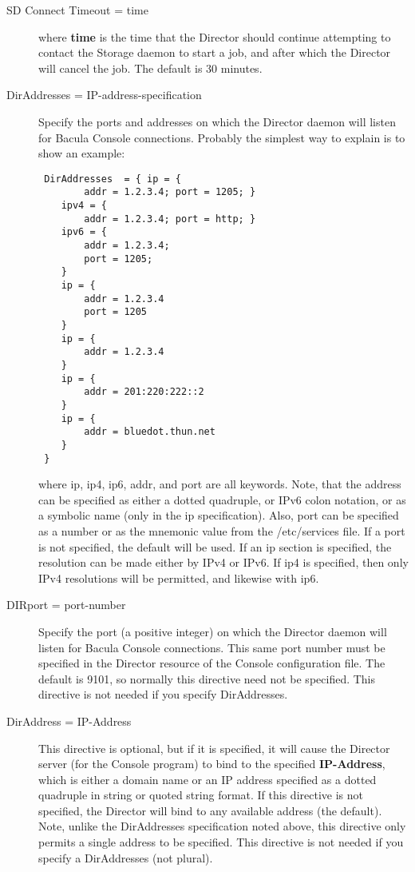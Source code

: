 \begin{description}
\item [SD Connect Timeout = \lt{}time\gt{}]
   where {\bf time}  is the time that the Director should continue attempting  to
contact the Storage daemon to start a job, and after which the  Director will
cancel the job. The default is 30 minutes. 

\item [DirAddresses = \lt{}IP-address-specification\gt{}]
   Specify the ports and addresses on which the Director daemon will  listen for
Bacula Console connections. Probably the simplest way  to explain is to show
an example: 

\footnotesize
\begin{verbatim}
 DirAddresses  = { ip = {
        addr = 1.2.3.4; port = 1205; }
    ipv4 = {
        addr = 1.2.3.4; port = http; }
    ipv6 = {
        addr = 1.2.3.4;
        port = 1205;
    }
    ip = {
        addr = 1.2.3.4
        port = 1205
    }
    ip = {
        addr = 1.2.3.4
    }
    ip = {
        addr = 201:220:222::2
    }
    ip = {
        addr = bluedot.thun.net
    }
 }
\end{verbatim}
\normalsize

where ip, ip4, ip6, addr, and port are all keywords. Note, that  the address
can be specified as either a dotted quadruple, or  IPv6 colon notation, or as
a symbolic name (only in the ip specification).  Also, port can be specified
as a number or as the mnemonic value from  the /etc/services file.  If a port
is not specified, the default will be used. If an ip  section is specified,
the resolution can be made either by IPv4 or  IPv6. If ip4 is specified, then
only IPv4 resolutions will be permitted,  and likewise with ip6. 

\item [DIRport = \lt{}port-number\gt{}]
   Specify the port (a positive  integer) on which the  Director daemon will
listen for Bacula Console connections.  This same port number must be
specified in the Director resource  of the Console configuration file. The
default is 9101, so  normally this directive need not be specified.  This
directive is not needed if you specify DirAddresses. 

\item [DirAddress = \lt{}IP-Address\gt{}]
   This directive is optional,  but if it is specified, it will cause the
Director server (for  the Console program) to bind to the specified {\bf
IP-Address},  which is either a domain name or an IP address specified as a 
dotted quadruple in string or quoted string format.  If this directive is not
specified, the Director  will bind to any available address (the default). 
Note, unlike the DirAddresses specification noted above, this  directive only
permits a single address to be specified.  This directive is not needed if you
specify a DirAddresses  (not plural). 
\end{description}


